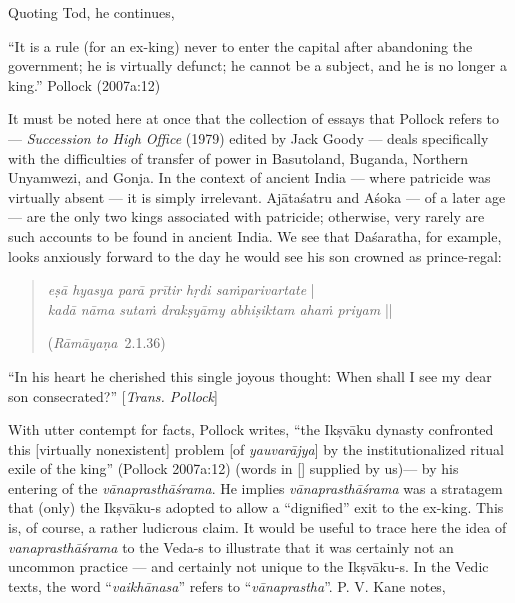 Quoting Tod, he continues,

\begin{myquote}
“It is a rule (for an ex-king) never to enter the capital after abandoning the government; he is virtually defunct; he cannot be a subject, and he is no longer a king.”
\hfill Pollock (2007a:12)
\end{myquote}

It must be noted here at once that the collection of essays that Pollock refers to --- {\sl Succession to High Office} (1979) edited by Jack Goody --- deals specifically with the difficulties of transfer of power in Basutoland, Buganda, Northern Unyamwezi, and Gonja. In the context of ancient India --- where patricide was virtually absent --- it is simply irrelevant. Ajātaśatru and Aśoka — of a later age — are the only two kings associated with patricide; otherwise, very rarely are such accounts to be found in ancient India. We see that Daśaratha, for example, looks anxiously forward to the day he would see his son crowned as prince-regal:
\begin{quote}
{{\sl eṣā hyasya parā prītir hṛdi saṁparivartate}} |\\
{{\sl kadā nāma sutaṁ drakṣyāmy abhiṣiktam ahaṁ priyam}} || 

\hfill({{\sl Rāmāyaṇa}}\relax \ 2.1.36)
\end{quote}

\begin{myquote}
“In his heart he cherished this single joyous thought: When shall I see my dear son consecrated?” [{\sl Trans. Pollock}]
\end{myquote}

With utter contempt for facts, Pollock writes, “the Ikṣvāku dynasty confronted this [virtually nonexistent] problem [of {\sl yauvarājya}] by the institutionalized ritual exile of the king” (Pollock 2007a:12) (words in [] supplied by us)--- by his entering of the {\sl vānaprasthāśrama}. He implies {\sl vānaprasthāśrama} was a stratagem that (only) the  Ikṣvāku-s adopted to allow a “dignified” exit to the ex-king. This is, of course, a rather ludicrous claim. It would be useful to trace here the idea of {\sl vanaprasthāśrama} to the \hbox{Veda-s} to illustrate that it was certainly not an uncommon practice --- and certainly not unique to the Ikṣvāku-s. In the Vedic texts, the word “{\sl vaikhānasa}” refers to “{\sl vānaprastha}”. P. V. Kane notes, 

